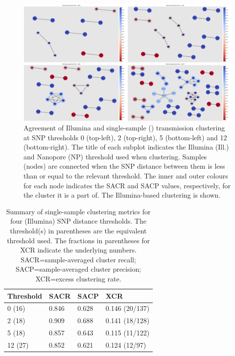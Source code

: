 \begin{figure}
\begin{center}
\includegraphics[width=0.90\columnwidth]{Chapter2/Figs/pandora_map_clusters.png}
\caption{{Agreement of Illumina and \pandora{} single-sample (\ont{}) transmission clustering at SNP
thresholds 0 (top-left), 2 (top-right), 5 (bottom-left) and 12 (bottom-right). The title of
each subplot indicates the Illumina (Ill.) and Nanopore (NP) threshold
used when clustering. Samples (nodes) are connected when the SNP
distance between them is less than or equal to the relevant threshold.
The inner and outer colours for each node indicates the SACR and SACP
values, respectively, for the cluster it is a part of. The
Illumina-based clustering is shown.
{\label{fig:map-clusters}}%
}}
\end{center}
\end{figure}

\begin{table}
\centering
\begin{tabular}{llll}
Threshold & SACR  & SACP  & XCR            \\
\hline
0 (16)    & 0.846 & 0.628 & 0.146 (20/137) \\
\hline
2 (18)    & 0.909 & 0.688 & 0.141 (18/128) \\
\hline
5 (18)    & 0.857 & 0.643 & 0.115 (11/122) \\
\hline
12 (27)   & 0.852 & 0.621 & 0.124 (12/97)  
\end{tabular}
\caption{Summary of \pandora{} single-sample clustering metrics for four (Illumina) SNP distance thresholds. The threshold(s) in parentheses are the \ont{} equivalent threshold used. The fractions in parentheses for XCR indicate the underlying numbers. SACR=sample-averaged cluster recall; SACP=sample-averaged cluster precision; XCR=excess clustering rate.}
\label{tab:map-cluster-summary}
\end{table}

